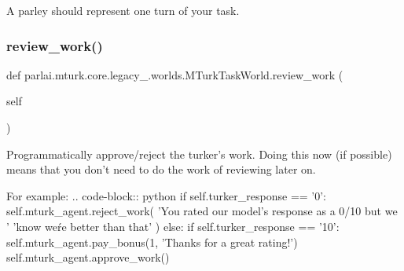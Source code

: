 \begin{DoxyVerb}A parley should represent one turn of your task.
\end{DoxyVerb}
 \mbox{\label{classparlai_1_1mturk_1_1core_1_1legacy__2018_1_1worlds_1_1MTurkTaskWorld_a9b6bbd7adb1a01ef6e1ec6b4b251c1cf}} 
\subsubsection{\texorpdfstring{review\+\_\+work()}{review\_work()}}
{\footnotesize\ttfamily def parlai.\+mturk.\+core.\+legacy\+\_.\+worlds.\+M\+Turk\+Task\+World.\+review\+\_\+work (\begin{DoxyParamCaption}\item[{}]{self }\end{DoxyParamCaption})}

\begin{DoxyVerb}Programmatically approve/reject the turker's work. Doing this now (if possible)
means that you don't need to do the work of reviewing later on.

For example:
.. code-block:: python
    if self.turker_response == '0':
self.mturk_agent.reject_work(
    'You rated our model's response as a 0/10 but we '
    'know we\'re better than that'
)
    else:
if self.turker_response == '10':
    self.mturk_agent.pay_bonus(1, 'Thanks for a great rating!')
self.mturk_agent.approve_work()
\end{DoxyVerb}
 \mbox{\label{classparlai_1_1mturk_1_1core_1_1legacy__2018_1_1worlds_1_1MTurkTaskWorld_ad4c0796e741cae72583bfb6311af054b}} 
